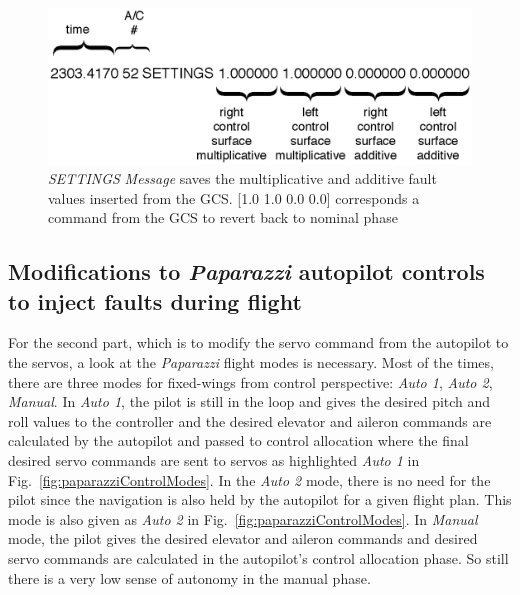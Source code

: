 \begin{figure}[h]
\begin{center}
\includegraphics[width=13cm]{figures/flightDataSettings}    %
\caption{\emph{SETTINGS} \emph{Message} saves the multiplicative and additive fault values inserted from the GCS.  [1.0 1.0 0.0 0.0] corresponds a command from the GCS to revert back to nominal phase} 
\label{fig:flightDataSettings}
\end{center}
\end{figure}

\subsection{Modifications to \emph{Paparazzi} autopilot controls to inject faults during flight}

For the second part, which is to modify the servo command from the autopilot to the servos, a look at the \emph{Paparazzi} flight modes is necessary. 
Most of the times, there are three modes for fixed-wings from control perspective:  \emph{Auto 1},  \emph{Auto 2},  \emph{Manual}. 
In  \emph{Auto 1}, the pilot is still in the loop and gives the desired pitch and roll values to the controller and the desired elevator and aileron commands are calculated by the autopilot and passed to control allocation where the final desired servo commands are sent to servos as highlighted  \emph{Auto 1} in Fig.~\ref{fig:paparazziControlModes}. 
In the  \emph{Auto 2} mode, there is no need for the pilot since the navigation is also held by the autopilot for a given flight plan. 
This mode is also given as  \emph{Auto 2} in Fig.~\ref{fig:paparazziControlModes}.
In  \emph{Manual} mode, the pilot gives the desired elevator and aileron commands and desired servo commands are calculated in the autopilot's control allocation phase. So still there is a very low sense of autonomy in the manual phase. 

